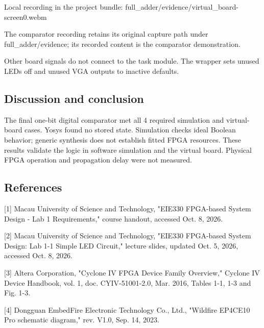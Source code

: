 \documentclass[10pt,a4paper]{article}
\begin{document}
{\small\raggedright Local recording in the project bundle: full\_adder/evidence/virtual\_board-screen0.webm\par}

{\small\raggedright The comparator recording retains its original capture path under full\_adder/evidence; its recorded content is the comparator demonstration.\par}

{\small\raggedright Other board signals do not connect to the task module. The wrapper sets unused LEDs off and unused VGA outputs to inactive defaults.\par}

\subsection*{Discussion and conclusion}

{\small\raggedright The final one-bit digital comparator met all 4 required simulation and virtual-board cases. Yosys found no stored state. Simulation checks ideal Boolean behavior; generic synthesis does not establish fitted FPGA resources. These results validate the logic in software simulation and the virtual board. Physical FPGA operation and propagation delay were not measured.\par}

\subsection*{References}

{\small\raggedright [1] Macau University of Science and Technology, "EIE330 FPGA-based System Design - Lab 1 Requirements," course handout, accessed Oct. 8, 2026.\par}

{\small\raggedright [2] Macau University of Science and Technology, "EIE330 FPGA-based System Design: Lab 1-1 Simple LED Circuit," lecture slides, updated Oct. 5, 2026, accessed Oct. 8, 2026.\par}

{\small\raggedright [3] Altera Corporation, "Cyclone IV FPGA Device Family Overview," Cyclone IV Device Handbook, vol. 1, doc. CYIV-51001-2.0, Mar. 2016, Tables 1-1, 1-3 and Fig. 1-3.\par}

{\small\raggedright [4] Dongguan EmbedFire Electronic Technology Co., Ltd., "Wildfire EP4CE10 Pro schematic diagram," rev. V1.0, Sep. 14, 2023.\par}
\end{document}
